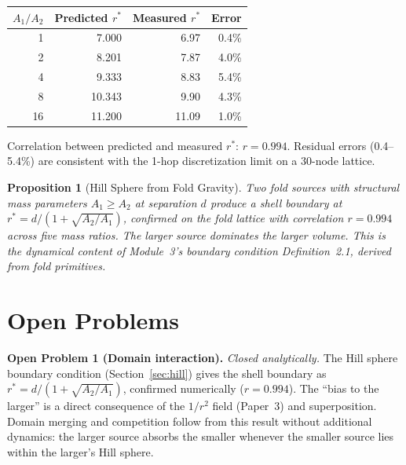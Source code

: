 \documentclass[12pt]{article}
\newtheorem{proposition}{Proposition}
\begin{document}
\begin{center}
\begin{tabular}{rrrr}
\toprule
$A_1/A_2$ & Predicted $r^*$ & Measured $r^*$ & Error \\
\midrule
1   & 7.000 & 6.97 & 0.4\% \\
2   & 8.201 & 7.87 & 4.0\% \\
4   & 9.333 & 8.83 & 5.4\% \\
8   & 10.343 & 9.90 & 4.3\% \\
16  & 11.200 & 11.09 & 1.0\% \\
\bottomrule
\end{tabular}
\end{center}

\vspace{4pt}
Correlation between predicted and measured $r^*$: $r = 0.994$.
Residual errors (0.4--5.4\%) are consistent with the 1-hop
discretization limit on a 30-node lattice.

\begin{proposition}[Hill Sphere from Fold Gravity]
  Two fold sources with structural mass parameters $A_1 \geq A_2$
  at separation $d$ produce a shell boundary at
  $r^* = d/(1+\sqrt{A_2/A_1})$, confirmed on the fold lattice
  with correlation $r=0.994$ across five mass ratios.
  The larger source dominates the larger volume.
  This is the dynamical content of Module~3's boundary condition
  Definition~2.1, derived from fold primitives.
\end{proposition}

\section{Open Problems}

\textbf{Open Problem 1 (Domain interaction).}
\textit{Closed analytically.} The Hill sphere boundary condition
(Section~\ref{sec:hill}) gives the shell boundary as
$r^* = d/(1+\sqrt{A_2/A_1})$, confirmed numerically ($r=0.994$).
The ``bias to the larger'' is a direct consequence of the
$1/r^2$ field (Paper~3) and superposition.
Domain merging and competition follow from this result without
additional dynamics: the larger source absorbs the smaller whenever
the smaller source lies within the larger's Hill sphere.
\end{document}
